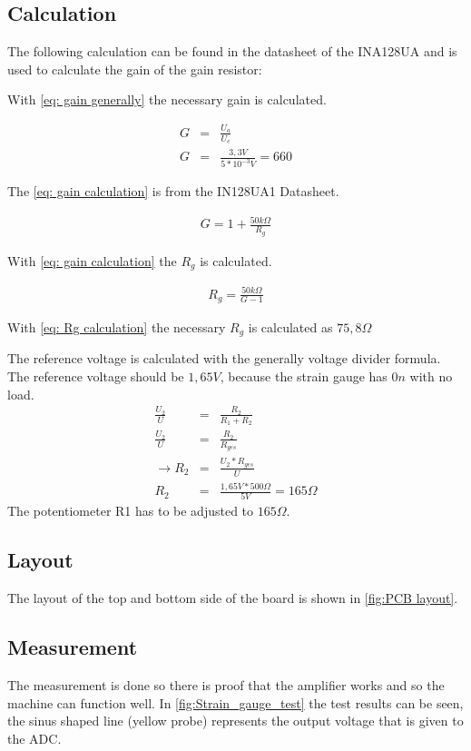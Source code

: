 \documentclass[a4paper,12pt]{scrreprt}
\begin{document}
\subsection{Calculation}
The following calculation can be found in the datasheet of the INA128UA and is used to calculate the gain of the gain resistor:

With  \autoref{eq: gain generally}  the necessary gain is calculated.

\begin{eqnarray}
G&=&\frac{U_{a}}{U_{e}}\label{eq: gain generally}\\
G&=&\frac{3,3V}{5*10^{-3}V}=660
\end{eqnarray}

The \autoref{eq: gain calculation} is from the IN128UA1 Datasheet.

\begin{eqnarray}
G=1+ \frac{50k \Omega}{R_{g}}\label{eq: gain calculation}
\end{eqnarray}

With \autoref{eq: gain calculation} the $R_{g}$ is calculated.

\begin{eqnarray}
R_{g} =  \frac{50k \Omega}{G-1}\label{eq: Rg calculation}
\end{eqnarray}

With \autoref{eq: Rg calculation} the necessary $R_{g}$ is calculated as $75,8 \Omega$

The reference voltage is calculated with the generally voltage divider formula. The reference voltage should be $1,65V$, because the strain gauge has $0n$ with no load.
\begin{eqnarray}
\frac{U_{2}}{U}&=&\frac{R_{2}}{R_{1}+ R_{2}}\\
\frac{U_{2}}{U}&=&\frac{R_{2}}{R_{ges}}\\
\rightarrow R_{2} &=& \frac{U_{2}*R_{ges}}{U}\\
R_{2} &=& \frac{1,65V*500\Omega}{5V}=165\Omega
\end{eqnarray}
The potentiometer R1 has to be adjusted to $165\Omega$.

\subsection{Layout}
The layout of the top and bottom side of the board is shown in \autoref{fig:PCB layout}.  

\subsection{Measurement}
The measurement is done so there is proof that the amplifier works and so the machine can function well. In \autoref{fig:Strain_gauge_test} the test results can be seen, the sinus shaped line (yellow probe) represents the output voltage that is given to the \acs{ADC}. 
\end{document}
